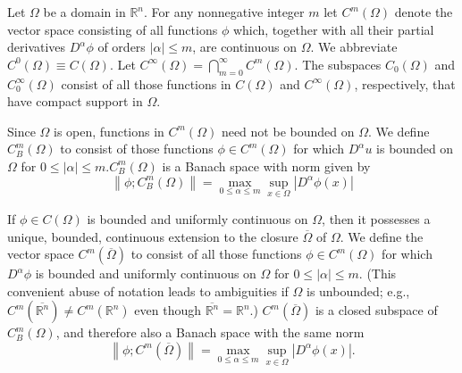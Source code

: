 \begin{para}
  Let $\Omega$ be a domain in $\mathbb{R}^n$. For any nonnegative integer $m$ let $C^m(\Omega)$ denote the vector space consisting of all functions $\phi$ which, together with all their partial derivatives $D^\alpha \phi$ of orders $|\alpha| \leq m$, are continuous on $\Omega$. We abbreviate $C^0(\Omega) \equiv C(\Omega)$. Let $C^{\infty}(\Omega)=\bigcap_{m=0}^{\infty} C^m(\Omega)$.
  The subspaces $C_0(\Omega)$ and $C_0^{\infty}(\Omega)$ consist of all those functions in $C(\Omega)$ and $C^{\infty}(\Omega)$, respectively, that have compact support in $\Omega$.
\end{para}


\begin{para}
  Since $\Omega$ is open, functions in $C^m(\Omega)$ need not be bounded on $\Omega$. We define $C_B^m(\Omega)$ to consist of those functions $\phi \in C^m(\Omega)$ for which $D^\alpha u$ is bounded on $\Omega$ for $0 \leq|\alpha| \leq m . C_B^m(\Omega)$ is a Banach space with norm given by
  \[
  \left\|\phi ; C_B^m(\Omega)\right\|=\max _{0 \leq \alpha \leq m} \sup _{x \in \Omega}\left|D^\alpha \phi(x)\right|
  \]
\end{para}

\begin{para}
  If $\phi \in C(\Omega)$ is bounded and uniformly continuous on $\Omega$, then it possesses a unique, bounded, continuous extension to the closure $\overline{\Omega}$ of $\Omega$. We define the vector space $C^m(\overline{\Omega})$ to consist of all those functions $\phi \in C^m(\Omega)$ for which $D^\alpha \phi$ is bounded and uniformly continuous on $\Omega$ for $0 \leq|\alpha| \leq m$. (This convenient abuse of notation leads to ambiguities if $\Omega$ is unbounded; e.g., $C^m\left(\overline{\mathbb{R}^n}\right) \neq C^m\left(\mathbb{R}^n\right)$ even though $\overline{\mathbb{R}^n}=\mathbb{R}^n$.) $C^m(\overline{\Omega})$ is a closed subspace of $C_B^m(\Omega)$, and therefore also a Banach space with the same norm
  \[
  \left\|\phi ; C^m(\overline{\Omega})\right\|=\max _{0 \leq \alpha \leq m} \sup _{x \in \Omega}\left|D^\alpha \phi(x)\right| .
  \]
\end{para}


